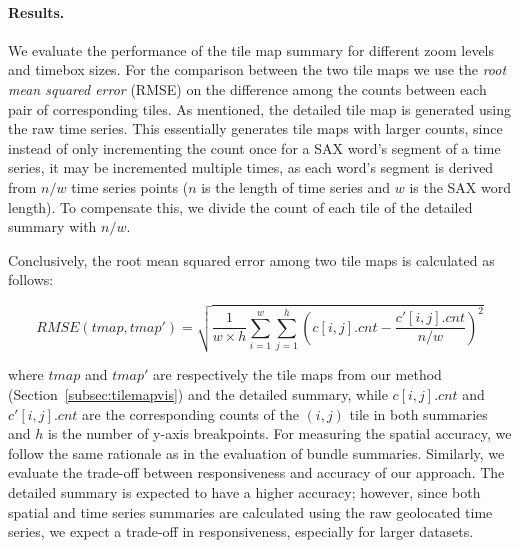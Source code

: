 \paragraph{Results.} We evaluate the performance of the tile map summary for different zoom levels and timebox sizes. For the comparison between the two tile maps we use the {\em root mean squared error} (RMSE) on the difference among the counts between each pair of corresponding tiles. As mentioned, the detailed tile map is generated using the raw time series. This essentially generates tile maps with larger counts, since instead of only incrementing the count once for a SAX word's segment of a time series, it may be incremented multiple times, as each word's segment is derived from $n/w$ time series points ($n$ is the length of time series and $w$ is the SAX word length). To compensate this, we divide the count of each tile of the detailed summary with $n/w$.

Conclusively, the root mean squared error among two tile maps is calculated as follows:

\begin{equation} \label{eq:rmse}
RMSE(tmap, tmap') = \sqrt{\frac{1}{w \times h}\displaystyle \sum_{i=1}^{w} \sum_{j=1}^{h}(c[i,j].cnt - \frac{c'[i,j].cnt}{n/w})^2} 
\end{equation}

\noindent where $tmap$ and $tmap'$ are respectively the tile maps from our method (Section~\ref{subsec:tilemapvis}) and the detailed summary, while $c[i,j].cnt$ and $c'[i,j].cnt$ are the corresponding counts of the $(i,j)$ tile in both summaries and $h$ is the number of y-axis breakpoints. For measuring the spatial accuracy, we follow the same rationale as in the evaluation of bundle summaries. Similarly, we evaluate the trade-off between responsiveness and accuracy of our approach. The detailed summary is expected to have a higher accuracy; however, since both spatial and time series summaries are calculated using the raw geolocated time series, we expect a trade-off in responsiveness, especially for larger datasets.

